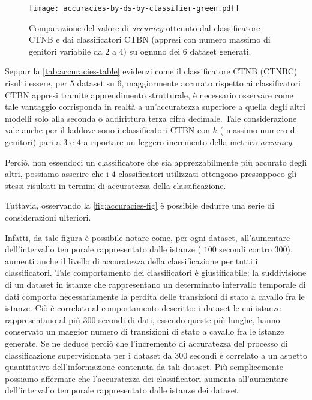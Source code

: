 \begin{figure}
	\centering
	\texttt{[image: accuracies-by-ds-by-classifier-green.pdf]}
	\caption[Accuratezza dei classificatori \acs{CTBN} e \acs{CTNB}]{Comparazione del valore di \emph{accuracy} ottenuto dal classificatore \acs{CTNB} e dai classificatori \acs{CTBN} (appresi con numero massimo di genitori variabile da $2$ a $4$) su ognuno dei $6$ dataset generati.}\label{fig:accuracies-fig}
\end{figure}
Seppur la \vref{tab:accuracies-table} evidenzi come il classificatore \acs{CTNB} (\acs{CTNBC}) risulti essere, per $5$ dataset su $6$, maggiormente accurato rispetto ai classificatori \acs{CTBN} appresi tramite apprendimento strutturale, è necessario osservare come tale vantaggio corrisponda in realtà a un'accuratezza superiore a quella degli altri modelli solo alla seconda o addirittura terza cifra decimale. Tale considerazione vale anche per il  laddove sono i classificatori \acs{CTBN} con $k$ (\ie{} massimo numero di genitori) pari a $3$ e $4$ a riportare un leggero incremento della metrica \emph{accuracy}.

Perciò, non essendoci un classificatore che sia apprezzabilmente più accurato degli altri, possiamo asserire che i $4$ classificatori utilizzati ottengono pressappoco gli stessi risultati in termini di accuratezza della classificazione.

Tuttavia, osservando la \vref{fig:accuracies-fig} è possibile dedurre una serie di considerazioni ulteriori.

Infatti, da tale figura è possibile notare come, per ogni dataset, all'aumentare dell'intervallo temporale rappresentato dalle istanze (\ie{} $100$ secondi contro $300$), aumenti anche il livello di accuratezza della classificazione per tutti i classificatori. Tale comportamento dei classificatori è giustificabile: la suddivisione di un dataset in istanze che rappresentano un determinato intervallo temporale di dati comporta necessariamente la perdita delle transizioni di stato a cavallo fra le istanze. Ciò è correlato al comportamento descritto: i dataset le cui istanze rappresentano al più $300$ secondi di dati, essendo queste più lunghe, hanno conservato un maggior numero di transizioni di stato a cavallo fra le istanze generate. Se ne deduce perciò che l'incremento di accuratezza del processo di classificazione supervisionata per i dataset da $300$ secondi è correlato a un aspetto quantitativo dell'informazione contenuta da tali dataset. Più semplicemente possiamo affermare che l'accuratezza dei classificatori aumenta all'aumentare dell'intervallo temporale rappresentato dalle istanze dei dataset.

